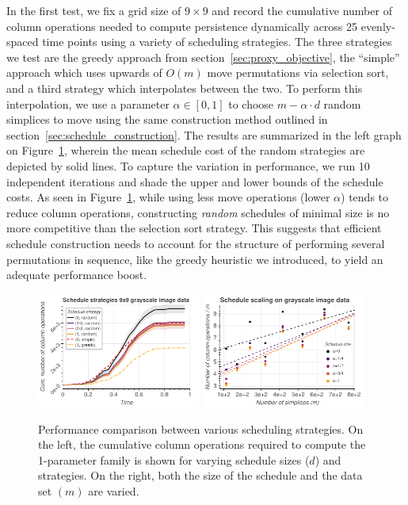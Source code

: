 \documentclass[sn-mathphys]{sn-jnl}
\begin{document}
 In the first test, we fix a grid size of $9 \times 9$ and record the cumulative number of column operations needed to compute persistence dynamically across 25 evenly-spaced time points using a variety of scheduling strategies.
 The three strategies we test are the greedy approach from section~\ref{sec:proxy_objective}, the ``simple'' approach which uses upwards of $O(m)$ move permutations via selection sort, and a third strategy which interpolates between the two. 
To perform this interpolation, we use a parameter $\alpha \in [0,1]$ to choose $m - \alpha \cdot d$ random simplices to move using the same construction method outlined in section~\ref{sec:schedule_construction}. 
The results are summarized in the left graph on Figure~\ref{fig:movie_perf}, wherein the mean schedule cost of the random strategies are depicted by solid lines. To capture the variation in performance, we run 10 independent iterations and shade the upper and lower bounds of the schedule costs. 
 As seen in Figure~\ref{fig:movie_perf}, while using less move operations (lower $\alpha$) tends to reduce column operations, constructing \emph{random} schedules of minimal size is no more competitive than the selection sort strategy. This suggests that efficient schedule construction needs to account for the structure of performing several permutations in sequence, like the greedy heuristic we introduced, to yield an adequate performance boost. 

\begin{figure}
	\centering
	\includegraphics[width=0.48\textwidth]{varying_d.pdf}
	\includegraphics[width=0.48\textwidth]{varying_nd.pdf}
	\caption{Performance comparison between various scheduling strategies. On the left, the cumulative column operations required to compute the 1-parameter family is shown for varying schedule sizes ($d$) and strategies. On the right, both the size of the schedule and the data set $(m)$ are varied. }
	\label{fig:movie_perf}
\end{figure}
\end{document}
